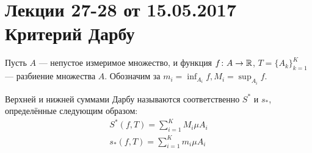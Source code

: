 \pagestyle{fancy}
\section{Лекции 27-28 от 15.05.2017 \\ Критерий Дарбу}
Пусть $A$ --- непустое измеримое множество, и функция $f\colon A \to \mathbb{R}$, $T = \{A_k\}_{k =1}^{K}$ --- разбиение множества $A$. Обозначим за $m_i = \inf_{A_i} f, M_i = \sup_{A_i} f$.
\begin{Def}
    Верхней и нижней суммами Дарбу называются соответственно $S^*$ и $s_*$, определённые следующим образом:
\begin{gather}
    S^*(f, T) = \sum\limits_{i =1}^{K} M_i \mu A_i\\
    s_*(f, T) = \sum\limits_{i =1}^{K} m_i \mu A_i\\
\end{gather}
\end{Def}

